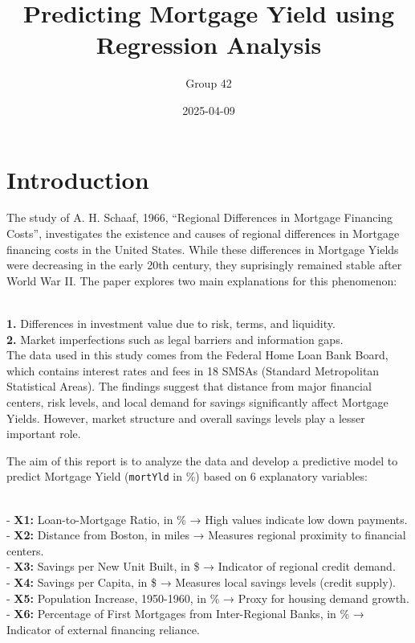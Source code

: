 \documentclass[
  11pt,
]{article}
\title{\textbf{Predicting Mortgage Yield using Regression Analysis}}
\author{Group 42}
\date{2025-04-09}
\begin{document}
\maketitle

\section{Introduction}\label{introduction}

The study of A. H. Schaaf, 1966, ``Regional Differences in Mortgage
Financing Costs'', investigates the existence and causes of regional
differences in Mortgage financing costs in the United States. While
these differences in Mortgage Yields were decreasing in the early 20th
century, they suprisingly remained stable after World War II. The paper
explores two main explanations for this phenomenon:\\
\strut \\
\textbf{1.} Differences in investment value due to risk, terms, and
liquidity.\\
\textbf{2.} Market imperfections such as legal barriers and information
gaps.\\

The data used in this study comes from the Federal Home Loan Bank Board,
which contains interest rates and fees in 18 SMSAs (Standard
Metropolitan Statistical Areas). The findings suggest that distance from
major financial centers, risk levels, and local demand for savings
significantly affect Mortgage Yields. However, market structure and
overall savings levels play a lesser important role.

The aim of this report is to analyze the data and develop a predictive
model to predict Mortgage Yield (\texttt{mortYld} in \%) based on 6
explanatory variables:\\
\strut \\
- \textbf{X1:} Loan-to-Mortgage Ratio, in \% → High values indicate low
down payments.\\
- \textbf{X2:} Distance from Boston, in miles → Measures regional
proximity to financial centers.\\
- \textbf{X3:} Savings per New Unit Built, in \$ → Indicator of regional
credit demand.\\
- \textbf{X4:} Savings per Capita, in \$ → Measures local savings levels
(credit supply).\\
- \textbf{X5:} Population Increase, 1950-1960, in \% → Proxy for housing
demand growth.\\
- \textbf{X6:} Percentage of First Mortgages from Inter-Regional Banks,
in \% → Indicator of external financing reliance.
\end{document}
